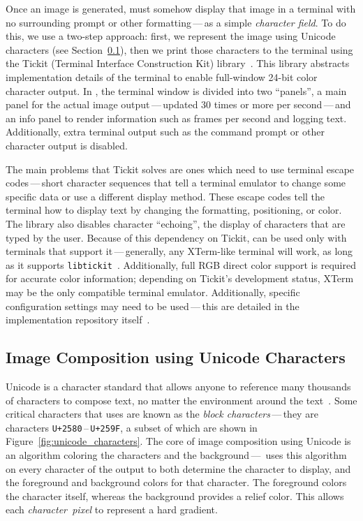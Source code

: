 Once an image is generated, \name{} must somehow display that image in a terminal with no surrounding prompt or other formatting\,---\,as a simple {\it character field}.
To do this, we use a two-step approach: first, we represent the image using Unicode characters (see Section~\ref{ch:intro:overview:unicode}), then we print those characters to the terminal using the Tickit (Terminal Interface Construction Kit) library~\cite{libtickitLibrary}.
This library abstracts implementation details of the terminal to enable full-window 24-bit color character output.
In \name{}, the terminal window is divided into two ``panels'', a main panel for the actual image output\,---\,updated 30 times or more per second\,---\,and an info panel to render information such as frames per second and logging text.
Additionally, extra terminal output such as the command prompt or other character output is disabled.

The main problems that Tickit solves are ones which need to use terminal escape codes\,---\,short character sequences that tell a terminal emulator to change some specific data or use a different display method.
These escape codes tell the terminal how to display text by changing the formatting, positioning, or color.
The library also disables character ``echoing'', the display of characters that are typed by the user.
Because of this dependency on Tickit, \name{} can be used only with terminals that support it\,---\,generally, any XTerm-like terminal will work, as long as it supports \texttt{libtickit}~\cite{libtickitLibrary}.
Additionally, full RGB direct color support is required for accurate color information; depending on Tickit's development status, XTerm may be the only compatible terminal emulator.
Additionally, specific configuration settings may need to be used\,---\,this are detailed in the implementation repository itself~\cite{raytermGpuImpl}.

\subsection{Image Composition using Unicode Characters}
\label{ch:intro:overview:unicode}

Unicode is a character standard that allows anyone to reference many thousands of characters to compose text, no matter the environment around the text~\cite{unicode}.
Some critical characters that \name{} uses are known as the {\it block characters\/}\,---\,they are characters \texttt{U+2580}\,--\,\texttt{U+259F}, a subset of which are shown in Figure~\ref{fig:unicode_characters}.
The core of image composition using Unicode is an algorithm coloring the characters and the background\,---\,\name{} uses this algorithm on every character of the output to both determine the character to display, and the foreground and background colors for that character.
The foreground colors the character itself, whereas the background provides a relief color.
This allows each {\it character~pixel\/} to represent a hard gradient.

